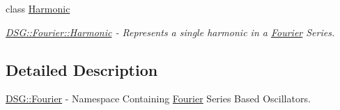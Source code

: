 \begin{DoxyCompactItemize}
class \hyperlink{class_d_s_g_1_1_fourier_1_1_harmonic}{Harmonic}
\begin{DoxyCompactList}\small\item\em \hyperlink{class_d_s_g_1_1_fourier_1_1_harmonic}{D\+S\+G\+::\+Fourier\+::\+Harmonic} -\/ Represents a single harmonic in a \hyperlink{namespace_d_s_g_1_1_fourier}{Fourier} Series. \end{DoxyCompactList}\end{DoxyCompactItemize}


\subsection{Detailed Description}
\hyperlink{namespace_d_s_g_1_1_fourier}{D\+S\+G\+::\+Fourier} -\/ Namespace Containing \hyperlink{namespace_d_s_g_1_1_fourier}{Fourier} Series Based Oscillators. 